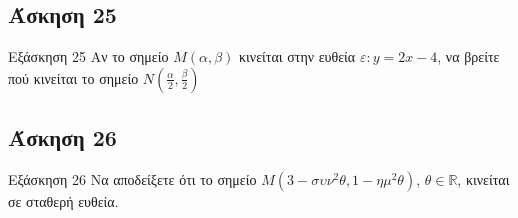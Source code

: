 \documentclass[greek]{beamer}
\begin{document}
\subsection{Άσκηση 25}
\begin{frame}[label=Άσκηση25]{Εξάσκηση 25}
 Αν το σημείο $Μ(α,β)$ κινείται στην ευθεία $ε:y=2x-4$, να βρείτε πού κινείται το σημείο $Ν\left(   \frac{α}{2},\frac{β}{2}\right)$

\end{frame}

\subsection{Άσκηση 26}
\begin{frame}[label=Άσκηση26]{Εξάσκηση 26}
 Να αποδείξετε ότι το σημείο $Μ(3-συν^2θ,1-ημ^2θ)$, $θ\in\mathbb{R}$, κινείται σε σταθερή ευθεία.

\end{frame}
\end{document}
